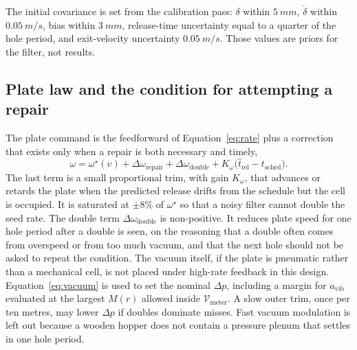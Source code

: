 The initial covariance is set from the calibration pass: \(\delta\) within \(\SI{5}{mm}\), \(\dot{\delta}\) within \(\SI{0.05}{m/s}\), bias within \(\SI{3}{mm}\), release-time uncertainty equal to a quarter of the hole period, and exit-velocity uncertainty \(\SI{0.05}{m/s}\). Those values are priors for the filter, not results.

\subsection{Plate law and the condition for attempting a repair}

The plate command is the feedforward of Equation~\eqref{eq:rate} plus a correction that exists only when a repair is both necessary and timely,
\begin{equation}
\label{eq:plate}
\omega = \omega^{\star}(v) + \Delta\omega_{\mathrm{repair}} + \Delta\omega_{\mathrm{double}} + K_{\omega}\bigl(\hat{t}_{\mathrm{rel}} - t_{\mathrm{sched}}\bigr).
\end{equation}
The last term is a small proportional trim, with gain \(K_{\omega}\), that advances or retards the plate when the predicted release drifts from the schedule but the cell is occupied. It is saturated at \(\pm\num{8}\%\) of \(\omega^{\star}\) so that a noisy filter cannot double the seed rate. The double term \(\Delta\omega_{\mathrm{double}}\) is non-positive. It reduces plate speed for one hole period after a double is seen, on the reasoning that a double often comes from overspeed or from too much vacuum, and that the next hole should not be asked to repeat the condition. The vacuum itself, if the plate is pneumatic rather than a mechanical cell, is not placed under high-rate feedback in this design. Equation~\eqref{eq:vacuum} is used to set the nominal \(\Delta p\), including a margin for \(a_{\mathrm{vib}}\) evaluated at the largest \(M(r)\) allowed inside \(\mathcal{V}_{\mathrm{meter}}\). A slow outer trim, once per ten metres, may lower \(\Delta p\) if doubles dominate misses. Fast vacuum modulation is left out because a wooden hopper does not contain a pressure plenum that settles in one hole period.

